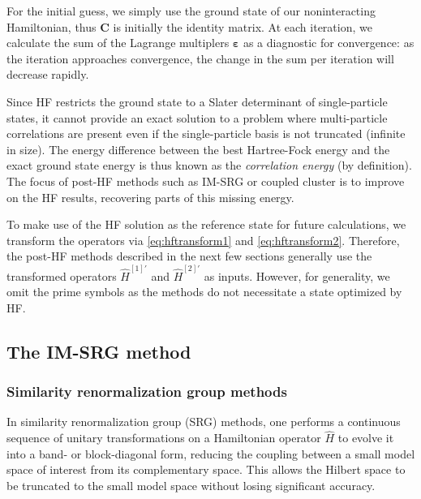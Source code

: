 For the initial guess, we simply use the ground state of our noninteracting Hamiltonian, thus $\bm{C}$ is initially the identity matrix.  At each iteration, we calculate the sum of the Lagrange multiplers $\bm{\varepsilon}$ as a diagnostic for convergence: as the iteration approaches convergence, the change in the sum per iteration will decrease rapidly.

Since HF restricts the ground state to a Slater determinant of single-particle states, it cannot provide an exact solution to a problem where multi-particle correlations are present even if the single-particle basis is not truncated (infinite in size).  The energy difference between the best Hartree-Fock energy and the exact ground state energy is thus known as the \textit{correlation energy} (by definition).  The focus of post-HF methods such as IM-SRG or coupled cluster is to improve on the HF results, recovering parts of this missing energy.

To make use of the HF solution as the reference state for future calculations, we transform the operators via \eqref{eq:hftransform1} and \eqref{eq:hftransform2}.  Therefore, the post-HF methods described in the next few sections generally use the transformed operators $\hat{H}^{[1] \prime}$ and $\hat{H}^{[2] \prime}$ as inputs.  However, for generality, we omit the prime symbols as the methods do not necessitate a state optimized by HF.

\subsection{The IM-SRG method}
\label{subsec:imsrgmethod}

\subsubsection{Similarity renormalization group methods}
\label{subsubsec:srgmethods}

In similarity renormalization group (SRG) methods, one performs a continuous
sequence of unitary transformations on a Hamiltonian operator $\hat H$ to
evolve it into a band- or block-diagonal form, reducing the coupling between a
small model space of interest from its complementary space.  This allows the
Hilbert space to be truncated to the small model space without losing
significant accuracy.

